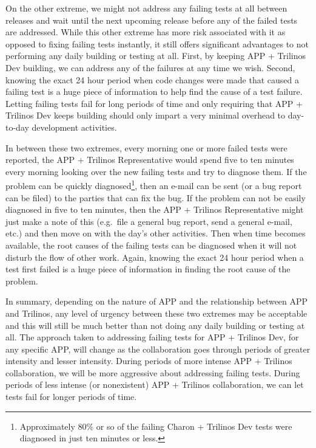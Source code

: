 \documentclass[pdf,ps2pdf,11pt]{SANDreport}
\begin{document}
On the other extreme, we might not address any failing tests at all between
releases and wait until the next upcoming release before any of the failed
tests are addressed.  While this other extreme has more risk associated with
it as opposed to fixing failing tests instantly, it still offers significant
advantages to not performing any daily building or testing at all.  First, by
keeping APP + Trilinos Dev building, we can address any of the failures at any
time we wish.  Second, knowing the exact 24 hour period when code changes were
made that caused a failing test is a huge piece of information to help find
the cause of a test failure.  Letting failing tests fail for long periods of
time and only requiring that APP + Trilinos Dev keeps building should only
impart a very minimal overhead to day-to-day development activities.

In between these two extremes, every morning one or more failed tests were
reported, the APP + Trilinos Representative would spend five to ten minutes
every morning looking over the new failing tests and try to diagnose them.  If
the problem can be quickly diagnosed\footnote{Approximately 80\% or so of the
failing Charon + Trilinos Dev tests were diagnosed in just ten minutes or
less.}, then an e-mail can be sent (or a bug report can be filed) to the
parties that can fix the bug.  If the problem can not be easily diagnosed in
five to ten minutes, then the APP + Trilinos Representative might just make a
note of this (e.g.\ file a general bug report, send a general e-mail, etc.) and
then move on with the day's other activities.  Then when time becomes
available, the root causes of the failing tests can be diagnosed when it will
not disturb the flow of other work.  Again, knowing the exact 24 hour period
when a test first failed is a huge piece of information in finding the root
cause of the problem.

In summary, depending on the nature of APP and the relationship between APP
and Trilinos, any level of urgency between these two extremes may be
acceptable and this will still be much better than not doing any daily
building or testing at all.  The approach taken to addressing failing tests
for APP + Trilinos Dev, for any specific APP, will change as the collaboration
goes through periods of greater intensity and lesser intensity.  During
periods of more intense APP + Trilinos collaboration, we will be more
aggressive about addressing failing tests.  During periods of less intense (or
nonexistent) APP + Trilinos collaboration, we can let tests fail for longer
periods of time.
\end{document}
